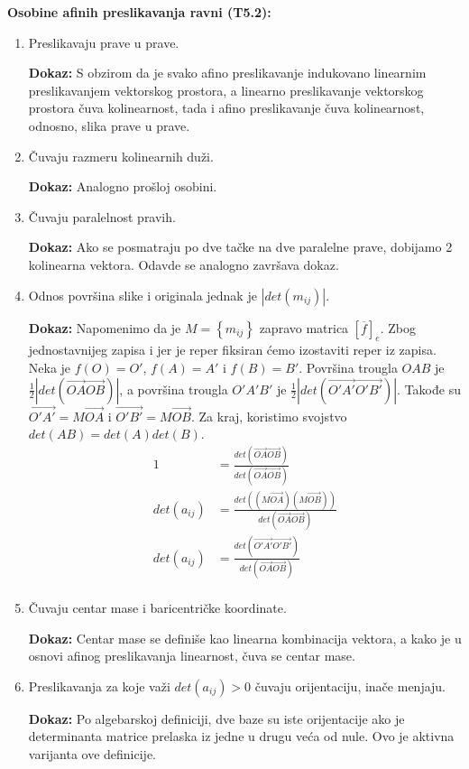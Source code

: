 \documentclass[12pt]{article}
\newcommand{\vek}[1]{\overrightarrow{#1}}
\begin{document}
\textbf{Osobine afinih preslikavanja ravni (T5.2):}
\begin{enumerate}[label=\textbf{(\arabic*)}]
    \item Preslikavaju prave u prave.
          \par
          \textbf{Dokaz:} S obzirom da je svako afino preslikavanje indukovano
          linearnim preslikavanjem vektorskog prostora, a linearno
          preslikavanje vektorskog prostora čuva kolinearnost, tada i afino
          preslikavanje čuva kolinearnost, odnosno, slika prave u prave.

    \item Čuvaju razmeru kolinearnih duži.
          \par
          \textbf{Dokaz:} Analogno prošloj osobini.

    \item Čuvaju paralelnost pravih.
          \par
          \textbf{Dokaz:} Ako se posmatraju po dve tačke na dve paralelne
          prave, dobijamo 2 kolinearna vektora. Odavde se analogno završava
          dokaz.

    \item Odnos površina slike i originala jednak je $|det(m_{ij})|$.
          \par
          \textbf{Dokaz:} Napomenimo da je $M=\left\{m_{ij}\right\}$ zapravo matrica
          $[\overline{f}]_e$. Zbog jednostavnijeg zapisa i jer je reper
          fiksiran ćemo izostaviti reper iz zapisa. Neka je $f(O)=O'$,
          $f(A)=A'$ i $f(B)=B'$. Površina trougla $OAB$ je
          $\frac{1}{2}|det(\vek{OA}\vek{OB})|$, a površina trougla $O'A'B'$ je
          $\frac{1}{2}|det(\vek{O'A'}\vek{O'B'})|$. Takođe su
          $\vek{O'A'}=M\vek{OA}$ i $\vek{O'B'}=M\vek{OB}$. Za kraj,
          koristimo svojstvo $det(AB)=det(A)det(B)$.
          \begin{align*}
              1           & =\frac{det(\vek{OA}\vek{OB})}{det(\vek{OA}\vek{OB})}       \\
              det(a_{ij}) & =\frac{det((M\vek{OA})(M\vek{OB}))}{det(\vek{OA}\vek{OB})} \\
              det(a_{ij}) & =\frac{det(\vek{O'A'}\vek{O'B'})}{det(\vek{OA}\vek{OB})}   \\
          \end{align*}

    \item Čuvaju centar mase i baricentričke koordinate.
          \par
          \textbf{Dokaz:} Centar mase se definiše kao linearna kombinacija
          vektora, a kako je u osnovi afinog preslikavanja linearnost, čuva
          se centar mase.

    \item Preslikavanja za koje važi $det(a_{ij})>0$ čuvaju orijentaciju,
          inače menjaju.
          \par
          \textbf{Dokaz:} Po algebarskoj definiciji, dve baze su iste
          orijentacije ako je determinanta matrice prelaska iz jedne u drugu
          veća od nule. Ovo je aktivna varijanta ove definicije.
\end{enumerate}
\par
\end{document}
